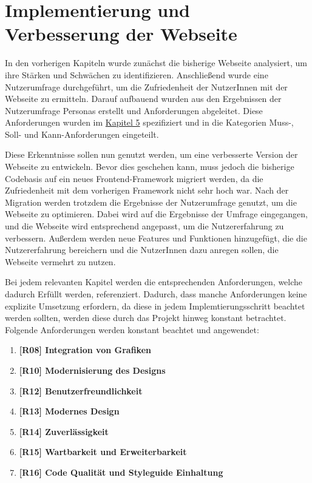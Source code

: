 
\chapter{Implementierung und Verbesserung der Webseite}
\label{chapter:6}

In den vorherigen Kapiteln wurde zunächst die bisherige Webseite analysiert, um ihre Stärken und Schwächen zu identifizieren.
Anschließend wurde eine Nutzerumfrage durchgeführt, um die Zufriedenheit der NutzerInnen mit der Webseite zu ermitteln.
Darauf aufbauend wurden aus den Ergebnissen der Nutzerumfrage Personas erstellt und Anforderungen abgeleitet.
Diese Anforderungen wurden im \hyperref[chapter:5]{Kapitel 5} spezifiziert und in die Kategorien Muss-, Soll- und Kann-Anforderungen eingeteilt.

Diese Erkenntnisse sollen nun genutzt werden, um eine verbesserte Version der Webseite zu entwickeln.
Bevor dies geschehen kann, muss jedoch die bisherige Codebasis auf ein neues Frontend-Framework migriert werden, da die Zufriedenheit mit dem vorherigen Framework nicht sehr hoch war.
Nach der Migration werden trotzdem die Ergebnisse der Nutzerumfrage genutzt, um die Webseite zu optimieren.
Dabei wird auf die Ergebnisse der Umfrage eingegangen, und die Webseite wird entsprechend angepasst, um die Nutzererfahrung zu verbessern.
Außerdem werden neue Features und Funktionen hinzugefügt, die die Nutzererfahrung bereichern und die NutzerInnen dazu anregen sollen, die Webseite vermehrt zu nutzen.

Bei jedem relevanten Kapitel werden die entsprechenden Anforderungen, welche dadurch Erfüllt werden, referenziert.
Dadurch, dass manche Anforderungen keine explizite Umsetzung erfordern, da diese in jedem Implemtierungsschritt beachtet werden sollten, werden diese durch das Projekt hinweg konstant betrachtet.
Folgende Anforderungen werden konstant beachtet und angewendet:

\begin{enumerate}

    \item \textbf{[R08] Integration von Grafiken}
    \item \textbf{[R10] Modernisierung des Designs}
    \item \textbf{[R12] Benutzerfreundlichkeit}
    \item \textbf{[R13] Modernes Design}
    \item \textbf{[R14] Zuverlässigkeit}
    \item \textbf{[R15] Wartbarkeit und Erweiterbarkeit}
    \item \textbf{[R16] Code Qualität und Styleguide Einhaltung}

\end{enumerate}


